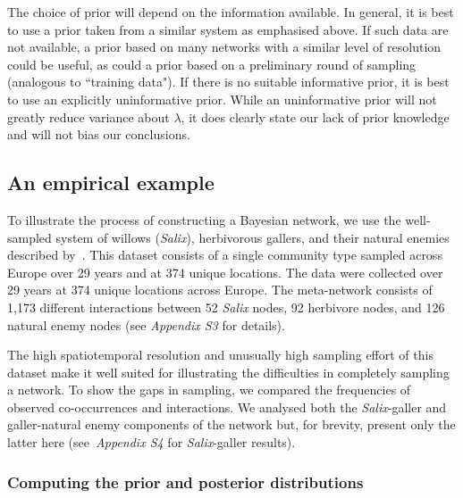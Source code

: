 \documentclass[12pt]{article}
\begin{document}
\begin{spacing}{2.0}
      The choice of prior will depend on the information available. In general, it is best to use a prior taken from a similar system as emphasised above. If such data are not available, a prior based on many networks with a similar level of resolution could be useful, as could a prior based on a preliminary round of sampling (analogous to ``training data"). If there is no suitable informative prior, it is best to use an explicitly uninformative prior. While an uninformative prior will not greatly reduce variance about $\lambda$, it does clearly state our lack of prior knowledge and will not bias our conclusions.


  \subsection*{An empirical example}

      To illustrate the process of constructing a Bayesian network, we use the well-sampled system of willows (\emph{Salix}), herbivorous gallers, and their natural enemies described by~\citet{Kopelke2017}. This dataset consists of a single community type sampled across Europe over 29 years and at 374 unique locations. The data were collected over 29 years at 374 unique locations across Europe. The meta-network consists of 1,173 different interactions between 52 \emph{Salix} nodes, 92 herbivore nodes, and 126 natural enemy nodes (see \emph{Appendix S3} for details). 


      The high spatiotemporal resolution and unusually high sampling effort of this dataset make it well suited for illustrating the difficulties in completely sampling a network. To show the gaps in sampling, we compared the frequencies of observed co-occurrences and interactions. We analysed both the \emph{Salix}-galler and galler-natural enemy components of the network but, for brevity, present only the latter here (see~\emph{Appendix S4} for \emph{Salix}-galler results). 


    \subsubsection*{Computing the prior and posterior distributions}


\end{spacing}
\end{document}
